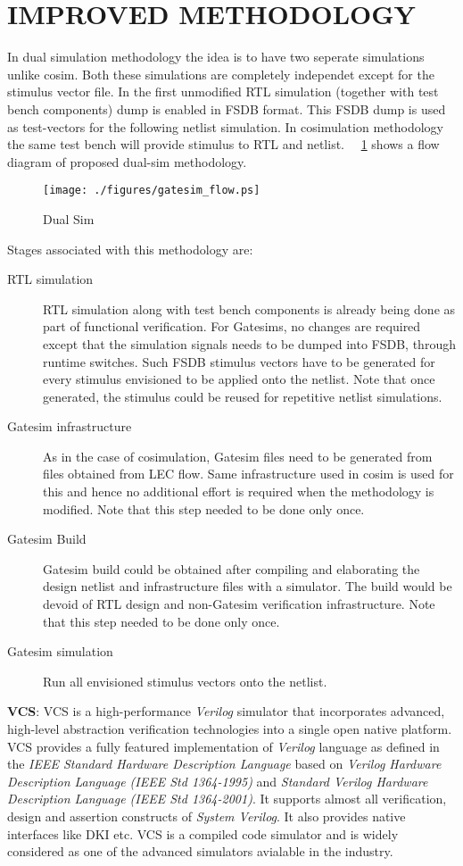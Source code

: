 \section {IMPROVED METHODOLOGY}
\label{sec:dualsim:im}
In dual simulation methodology the idea is to have two seperate simulations unlike cosim. Both these simulations are completely independet except for the stimulus vector file. In the first unmodified RTL simulation (together with test bench components) dump is enabled in FSDB format. This FSDB dump is used as test-vectors for the following netlist simulation. In cosimulation methodology the same test bench will provide stimulus to RTL and netlist. ~\figurename{~\ref{fig:gatesim_flow.ps}} shows a flow diagram of proposed dual-sim methodology.  
\begin{figure}[h]
\centering
\texttt{[image: ./figures/gatesim\_flow.ps]}
\caption{Dual Sim}
\label{fig:gatesim_flow.ps}
\end{figure}

Stages associated with this methodology are:
\begin{description}
	\item[RTL simulation] RTL simulation along with test bench components is already being done as part of functional verification. For Gatesims, no changes are required except that the simulation signals needs to be dumped into FSDB, through runtime switches. Such FSDB stimulus vectors have to be generated for every stimulus envisioned to be applied onto the netlist. Note that once generated, the stimulus could be reused for repetitive netlist simulations.
	\item[Gatesim infrastructure] As in the case of cosimulation, Gatesim files need to be generated from files obtained from LEC flow. Same infrastructure used in cosim is used for this and hence no additional effort is required when the methodology is modified. Note that this step needed to be done only once.
	\item[Gatesim Build] Gatesim build could be obtained after compiling and elaborating the design netlist and infrastructure files with a simulator. The build would be devoid of RTL design and non-Gatesim verification infrastructure. Note that this step needed to be done only once.
	\item[Gatesim simulation] Run all envisioned stimulus vectors onto the netlist.
\end{description}


{\bf VCS}: VCS is a high-performance {\it Verilog} simulator that  incorporates advanced, high-level abstraction verification  technologies into a single open native platform. VCS provides a fully featured implementation of {\it Verilog} language as defined in the {\it IEEE Standard Hardware Description Language} based on {\it Verilog Hardware Description Language (IEEE Std 1364-1995)} and {\it Standard Verilog Hardware Description Language (IEEE Std 1364-2001)}. It supports almost all verification, design and assertion constructs of {\it System Verilog}. It also provides native interfaces like DKI etc. VCS is a compiled code simulator and is widely considered as one of the advanced simulators avialable in the industry.

